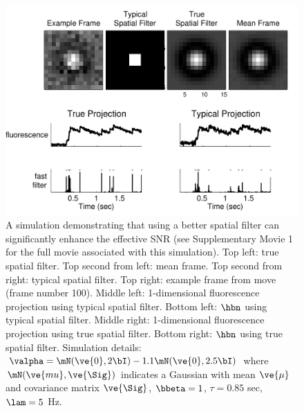 \begin{figure}[h!]
\centering \includegraphics[width=.9\linewidth]{../figs/spatial2}
\caption{A simulation demonstrating that using a better spatial filter can significantly enhance the effective SNR (see Supplementary Movie 1 for the full movie associated with this simulation).  Top left: true spatial filter.  Top second from left: mean frame.  Top second from right: typical spatial filter.   Top right: example frame from move (frame number 100).  Middle left: 1-dimensional fluorescence projection using typical spatial filter.  Bottom left: $\hbn$ using typical spatial filter.  Middle right: 1-dimensional fluorescence projection using true spatial filter.  Bottom right: $\hbn$ using true spatial filter. Simulation details: $\valpha=\mN(\ve{0},2 \bI)-1.1 \mN(\ve{0},2.5 \bI)$ where $\mN(\ve{mu},\ve{\Sig})$ indicates a Gaussian with mean $\ve{\mu}$ and covariance matrix $\ve{\Sig}$, $\bbeta=1$, $\tau=0.85$ sec, $\lam=5$ Hz.} \label{fig:spatial} \end{figure} 